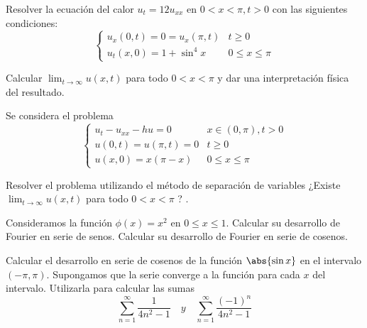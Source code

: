 \begin{problem}[5]Resolver la ecuación del calor $ u_t=12u_{xx} $ en $ 0<x<\pi, t>0 $ con las siguientes condiciones: \[ \begin{cases}
u_x(0,t) = 0 = u_x(\pi, t) 	& t ≥ 0 \\
u_t(x,0) = 1 + \sin^4 x        & 0 ≤ x ≤ π
\end{cases} \]

Calcular $ \lim_{t \to ∞} u(x,t) $ para todo $ 0 < x < \pi $ y dar una interpretación física del resultado.

\solution

\end{problem}





\begin{problem}[6] Se considera el problema \[
\begin{cases}
u_t - u_{xx} - hu = 0 & x ∈ (0,π), t > 0 \\
u(0,t) = u(π,t) = 0 & t \geq 0 \\
u(x,0) = x(π-x) & 0 \leq x \leq \pi
\end{cases}\]

\ppart Resolver el problema utilizando el método de separación de variables
\ppart ¿Existe $ \lim_{t \to ∞}u(x,t) $ para todo $ 0 < x < \pi $ ? .

\solution

\end{problem}





\begin{problem}[7] Consideramos la función $ \phi(x) = x^2 $ en $ 0 \leq x \leq 1 $.
\ppart Calcular su desarrollo de Fourier en serie de senos.
\ppart Calcular su desarrollo de Fourier en serie de cosenos.

\solution
\end{problem}





\begin{problem}[8] Calcular el desarrollo en serie de cosenos de la función $ \abs{\sin x} $ en el intervalo $ (-\pi, \pi) $. Supongamos que la serie converge a la función para cada $ x $ del intervalo. Utilizarla para calcular las sumas \[ \sum_{n=1}^{\infty} \frac{1}{4n^2-1} \quad y \quad \sum_{n=1}^{\infty} \frac{(-1)^n}{4n^2-1} \]


\solution
\end{problem}





